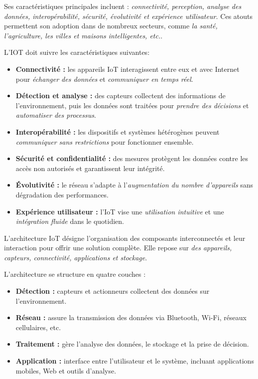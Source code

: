 Ses caractéristiques principales incluent : \emph{connectivité, perception, analyse des données, interopérabilité, sécurité, évolutivité et expérience utilisateur.} Ces atouts permettent son adoption dans de nombreux secteurs, comme \emph{la santé, l'agriculture, les villes et maisons intelligentes, etc.}.


L'IOT doit suivre les caractéristiques suivantes:

\begin{itemize}
  \item \textbf{Connectivité :} les appareils IoT interagissent entre eux et avec 
  Internet pour \textit{échanger des données} et \textit{communiquer en temps réel}.  
  \item \textbf{Détection et analyse :} des capteurs collectent des informations de 
  l'environnement, puis les données sont traitées pour \textit{prendre des décisions} 
  et \textit{automatiser des processus}.  
  \item \textbf{Interopérabilité :} les dispositifs et systèmes hétérogènes 
  peuvent \textit{communiquer sans restrictions} pour fonctionner ensemble.  
  \item \textbf{Sécurité et confidentialité :} des mesures protègent les données 
  contre les accès non autorisés et garantissent leur intégrité.  
  \item \textbf{Évolutivité :} le réseau s'adapte à l'\textit{augmentation du 
  nombre d'appareils} sans dégradation des performances.  
  \item \textbf{Expérience utilisateur :} l'IoT vise une \textit{utilisation 
  intuitive} et une \textit{intégration fluide} dans le quotidien.
\end{itemize}


L'architecture IoT désigne l'organisation des composants interconnectés et leur interaction pour offrir une solution complète. Elle repose sur \textit{des appareils, capteurs, connectivité, applications et stockage}.  

L'architecture se structure en quatre couches :  
\begin{itemize}
  \item \textbf{Détection :} capteurs et actionneurs collectent des données sur l'environnement.  
  \item \textbf{Réseau :} assure la transmission des données via Bluetooth, Wi-Fi, réseaux cellulaires, etc.  
  \item \textbf{Traitement :} gère l'analyse des données, le stockage et la prise de décision.  
  \item \textbf{Application :} interface entre l'utilisateur et le système, incluant applications mobiles, Web et outils d'analyse.  
\end{itemize}

